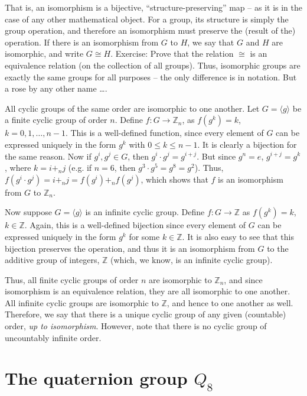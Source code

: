 \documentclass[svgnames]{article}
\theoremstyle{definition}
\theoremstyle{remark}
\begin{document}
\begin{appendices}
That is, an isomorphism is a bijective, ``structure-preserving'' map -- as it is in the case of any other mathematical object. For a group, its structure is simply the group operation, and therefore an isomorphism must preserve the (result of the) operation. If there is an isomorphism from $G$ to $H$, we say that $G$ and $H$ are isomorphic, and write $G \cong H$. {\small Exercise: Prove that the relation $\cong$ is an equivalence relation (on the collection of all groups)}. Thus, isomorphic groups are exactly the same groups for all purposes -- the only difference is in notation. But a rose by any other name \ldots.

All cyclic groups of the same order are isomorphic to one another. Let $G = \langle g \rangle$ be a finite cyclic group of order $n$. Define $f \colon G \to \mathbb Z_n$, as $f(g^k) = k$, $k = 0, 1, \ldots, n - 1$. This is a well-defined function, since every element of $G$ can be expressed uniquely in the form $g^k$ with $0 \le k \le n - 1$. It is clearly a bijection for the same reason. Now if $g^i, g^j \in G$, then $g^i \cdot g^j = g^{i + j}$. But since $g^n = e$, $g^{i + j} = g^k$, where $k = i +_n j$ (e.g. if $n = 6$, then $g^3 \cdot g^5 = g^8 = g^2$). Thus, $f(g^i \cdot g^j) = i +_n j = f(g^i) +_n f(g^j)$, which shows that $f$ is an isomorphism from $G$ to $\mathbb Z_n$.

Now suppose $G = \langle g \rangle$ is an infinite cyclic group. Define $f\colon G \to \mathbb Z$ as $f(g^k) = k$, $k \in \mathbb Z$. Again, this is a well-defined bijection since every element of $G$ can be expressed uniquely in the form $g^k$ for some $k \in \mathbb Z$. It is also easy to see that this bijection preserves the operation, and thus it is an isomorphism from $G$ to the additive group of integers, $\mathbb Z$ (which, we know, is an infinite cyclic group).

Thus, all finite cyclic groups of order $n$ are isomorphic to $\mathbb Z_n$, and since isomorphism is an equivalence relation, they are all isomorphic to one another. All infinite cyclic groups are isomorphic to $\mathbb Z$, and hence to one another as well. Therefore, we say that there is a unique cyclic group of any given (countable) order, \emph{up to isomorphism}. However, note that there is no cyclic group of uncountably infinite order.

\section{The quaternion group $Q_8$}\label{sec:Q8}


\end{appendices}
\end{document}
